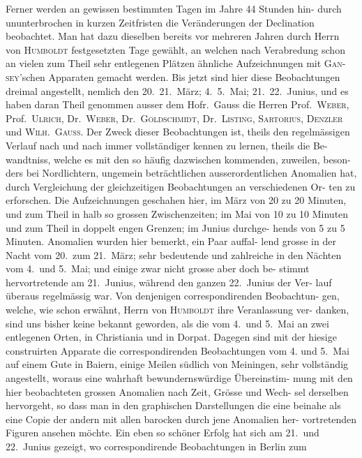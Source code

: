 \documentclass[12pt,a4paper]{article}
\begin{document}
Ferner werden an gewissen bestimmten Tagen im Jahre 44 Stunden hin-
durch ununterbrochen in kurzen Zeitfristen die Veränderungen der Declination 
beobachtet. Man hat dazu dieselben bereits vor mehreren Jahren durch Herrn 
von \textsc{Humboldt} festgesetzten Tage gewählt, an welchen nach Verabredung schon 
an vielen zum Theil sehr entlegenen Plätzen ähnliche Aufzeichnungen mit \textsc{Gan}-
\textsc{sey}'schen Apparaten gemacht werden. Bis jetzt sind hier diese Beobachtungen 
dreimal angestellt, nemlich den 20.\ 21.\ März; 4.\ 5.\ Mai; 21.\ 22.\ Junius, und es 
haben daran Theil genommen ausser dem Hofr.\ Gauss die Herren Prof.\ \textsc{Weber}, 
Prof.\ \textsc{Ulrich}, Dr.\ \textsc{Weber}, Dr.\ \textsc{Goldschmidt}, Dr.\ \textsc{Listing}, \textsc{Sartorius}, \textsc{Denzler} und 
\textsc{Wilh.\ Gauss}. Der Zweck dieser Beobachtungen ist, theils den regelmässigen 
Verlauf nach und nach immer vollständiger kennen zu lernen, theils die Be-
wandtniss, welche es mit den so häufig dazwischen kommenden, zuweilen, beson-
ders bei Nordlichtern, ungemein beträchtlichen ausserordentlichen Anomalien 
hat, durch Vergleichung der gleichzeitigen Beobachtungen an verschiedenen Or-
ten zu erforschen. Die Aufzeichnungen geschahen hier, im März von 20 zu 
20 Minuten, und zum Theil in halb so grossen Zwischenzeiten; im Mai von 10 
zu 10 Minuten und zum Theil in doppelt engen Grenzen; im Junius durchge-
hends von 5 zu 5 Minuten. Anomalien wurden hier bemerkt, ein Paar auffal-
lend grosse in der Nacht vom 20.\ zum 21.\ März; sehr bedeutende und zahlreiche 
in den Nächten vom 4.\ und 5.\ Mai; und einige zwar nicht grosse aber doch be-
stimmt hervortretende am 21.\ Junius, während den ganzen 22.\ Junius der Ver-
lauf überaus regelmässig war. Von denjenigen correspondirenden Beobachtun-
gen, welche, wie schon erwähnt, Herrn von \textsc{Humboldt} ihre Veranlassung ver-
danken, sind uns bisher keine bekannt geworden, als die vom 4.\ und 5.\ Mai 
an zwei entlegenen Orten, in Christiania und in Dorpat. Dagegen sind mit 
der hiesige construirten Apparate die correspondirenden Beobachtungen vom 4. 
und 5.\ Mai auf einem Gute in Baiern, einige Meilen südlich von Meiningen, sehr 
vollständig angestellt, woraus eine wahrhaft bewundernswürdige Übereinstim-
mung mit den hier beobachteten grossen Anomalien nach Zeit, Grösse und Wech-
sel derselben hervorgeht, so dass man in den graphischen Darstellungen die eine 
beinahe als eine Copie der andern mit allen barocken durch jene Anomalien her-
vortretenden Figuren ansehen möchte. Ein eben so schöner Erfolg hat sich am 
21.\ und 22.\ Junius gezeigt, wo correspondirende Beobachtungen in Berlin zum 
\end{document}
